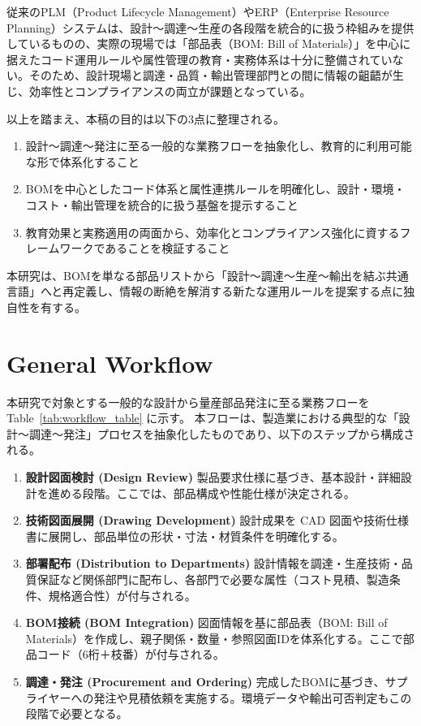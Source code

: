\documentclass[10pt,conference]{IEEEtran}
\begin{document}
従来のPLM（Product Lifecycle Management）やERP（Enterprise Resource Planning）システムは、設計～調達～生産の各段階を統合的に扱う枠組みを提供しているものの、実際の現場では「部品表（BOM: Bill of Materials）」を中心に据えたコード運用ルールや属性管理の教育・実務体系は十分に整備されていない。そのため、設計現場と調達・品質・輸出管理部門との間に情報の齟齬が生じ、効率性とコンプライアンスの両立が課題となっている。

以上を踏まえ、本稿の目的は以下の3点に整理される。
\begin{enumerate}
  \item 設計～調達～発注に至る一般的な業務フローを抽象化し、教育的に利用可能な形で体系化すること
  \item BOMを中心としたコード体系と属性連携ルールを明確化し、設計・環境・コスト・輸出管理を統合的に扱う基盤を提示すること
  \item 教育効果と実務適用の両面から、効率化とコンプライアンス強化に資するフレームワークであることを検証すること
\end{enumerate}

本研究は、BOMを単なる部品リストから「設計～調達～生産～輸出を結ぶ共通言語」へと再定義し、情報の断絶を解消する新たな運用ルールを提案する点に独自性を有する。

\section{General Workflow}
本研究で対象とする一般的な設計から量産部品発注に至る業務フローを Table~\ref{tab:workflow_table} に示す。
本フローは、製造業における典型的な「設計～調達～発注」プロセスを抽象化したものであり、以下のステップから構成される。

\begin{enumerate}
  \item \textbf{設計図面検討 (Design Review)}  
  製品要求仕様に基づき、基本設計・詳細設計を進める段階。ここでは、部品構成や性能仕様が決定される。
  
  \item \textbf{技術図面展開 (Drawing Development)}  
  設計成果を CAD 図面や技術仕様書に展開し、部品単位の形状・寸法・材質条件を明確化する。
  
  \item \textbf{部署配布 (Distribution to Departments)}  
  設計情報を調達・生産技術・品質保証など関係部門に配布し、各部門で必要な属性（コスト見積、製造条件、規格適合性）が付与される。
  
  \item \textbf{BOM接続 (BOM Integration)}  
  図面情報を基に部品表（BOM: Bill of Materials）を作成し、親子関係・数量・参照図面IDを体系化する。ここで部品コード（6桁＋枝番）が付与される。
  
  \item \textbf{調達・発注 (Procurement and Ordering)}  
  完成したBOMに基づき、サプライヤーへの発注や見積依頼を実施する。環境データや輸出可否判定もこの段階で必要となる。
\end{enumerate}
\end{document}

